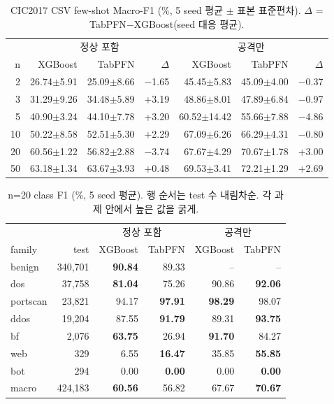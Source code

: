 \begin{table}[H]
\centering\small
\caption{CIC2017 CSV few-shot Macro-F1 (\%, 5 seed 평균 $\pm$ 표본 표준편차). $\Delta$ = TabPFN$-$XGBoost(seed 대응 평균).}
\begin{tabular}{r|rrr|rrr}
\toprule
& \multicolumn{3}{c|}{정상 포함} & \multicolumn{3}{c}{공격만}\\
n & XGBoost & TabPFN & $\Delta$ & XGBoost & TabPFN & $\Delta$\\\midrule
2  & 26.74$\pm$5.91 & 25.09$\pm$8.66 & $-$1.65 & 45.45$\pm$5.83 & 45.09$\pm$4.00 & $-$0.37\\
3  & 31.29$\pm$9.26 & 34.48$\pm$5.89 & +3.19 & 48.86$\pm$8.01 & 47.89$\pm$6.84 & $-$0.97\\
5  & 40.90$\pm$3.24 & 44.10$\pm$7.78 & +3.20 & 60.52$\pm$14.42 & 55.66$\pm$7.88 & $-$4.86\\
10 & 50.22$\pm$8.58 & 52.51$\pm$5.30 & +2.29 & 67.09$\pm$6.26 & 66.29$\pm$4.31 & $-$0.80\\
20 & 60.56$\pm$1.22 & 56.82$\pm$2.88 & $-$3.74 & 67.67$\pm$4.29 & 70.67$\pm$1.78 & +3.00\\
50 & 63.18$\pm$1.34 & 63.67$\pm$3.93 & +0.48 & 69.53$\pm$3.41 & 72.21$\pm$1.29 & +2.69\\
\bottomrule
\end{tabular}
\end{table}

\begin{table}[H]
\centering\small
\caption{n=20 class F1 (\%, 5 seed 평균). 행 순서는 test 수 내림차순. 각 과제 안에서 높은 값을 굵게.}
\begin{tabular}{lrrr|rr}
\toprule & & \multicolumn{2}{c|}{정상 포함} & \multicolumn{2}{c}{공격만}\\
family & test & XGBoost & TabPFN & XGBoost & TabPFN\\\midrule
benign & 340,701 & \textbf{90.84} & 89.33 & -- & --\\
dos & 37,758 & \textbf{81.04} & 75.26 & 90.86 & \textbf{92.06}\\
portscan & 23,821 & 94.17 & \textbf{97.91} & \textbf{98.29} & 98.07\\
ddos & 19,204 & 87.55 & \textbf{91.79} & 89.31 & \textbf{93.75}\\
bf & 2,076 & \textbf{63.75} & 26.94 & \textbf{91.70} & 84.27\\
web & 329 & 6.55 & \textbf{16.47} & 35.85 & \textbf{55.85}\\
bot & 294 & 0.00 & \textbf{0.00} & 0.00 & \textbf{0.00}\\\midrule
macro & 424,183 & \textbf{60.56} & 56.82 & 67.67 & \textbf{70.67}\\
\bottomrule
\end{tabular}
\end{table}

